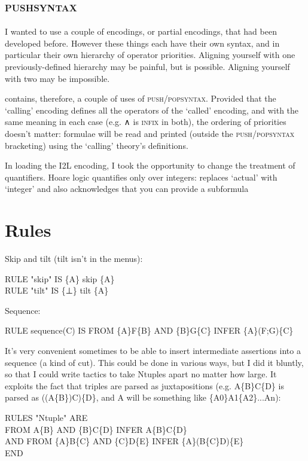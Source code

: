 \subsection{\textsc{pushsyntax}}
\label{sec:Hoare:pushsyntax}

I wanted to use a couple of encodings, or partial encodings, that had been developed before. However these things each have their own syntax, and in particular their own hierarchy of operator priorities. Aligning yourself with one previously-defined hierarchy may be painful, but is possible. Aligning yourself with two may be impossible.

 contains, therefore, a couple of uses of \textsc{push}/\textsc{popsyntax}. Provided that the `calling' encoding defines all the operators of the `called' encoding, and with the same meaning in each case (e.g. ∧ is \textsc{infix} in both), the ordering of priorities doesn't matter: formulae will be read and printed (outside the \textsc{push}/\textsc{popsyntax} bracketing) using the `calling' theory's definitions.

In loading the I2L encoding, I took the opportunity to change the treatment of quantifiers. Hoare logic quantifies only over integers:  replaces `actual' with `integer' and also acknowledges that you can provide a subformula
\section{Rules}

Skip and tilt (tilt isn't in the menus):
\begin{japeish}
RULE "skip" IS \{A\} skip \{A\} \\
RULE "tilt" IS \{⊥\} tilt \{A\}
\end{japeish}
 
Sequence:
\begin{japeish}
RULE sequence(C) IS FROM \{A\}F\{B\} AND  \{B\}G\{C\} INFER  \{A\}(F;G)\{C\}
\end{japeish}

It's very convenient sometimes to be able to insert intermediate assertions into a sequence (a kind of cut). This could be done in various ways, but I did it bluntly, so that I could write tactics to take Ntuples apart no matter how large. It exploits the fact that triples are parsed as juxtapositions (e.g. A\{B\}C\{D\} is parsed as ((A\{B\})C)\{D\}, and A will be something like \{A0\}A1\{A2\}...An):
\begin{japeish}
RULES "Ntuple" ARE \\
\tab FROM A\{B\} AND \{B\}C\{D\} INFER A\{B\}C\{D\} \\
AND FROM \{A\}B\{C\} AND \{C\}D\{E\} INFER \{A\}(B\{C\}D)\{E\} \\
END
\end{japeish}


